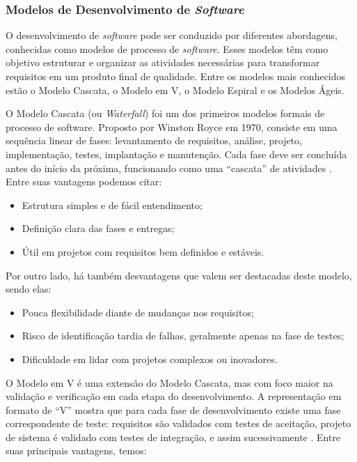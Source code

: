 \documentclass[english,brazilian]{UNISINOSartigo} %
\begin{document}
\subsubsection{Modelos de Desenvolvimento de \textit{Software}}

O desenvolvimento de \textit{software} pode ser conduzido por diferentes abordagens, conhecidas como modelos de processo de \textit{software}. Esses modelos têm como objetivo estruturar e organizar as atividades necessárias para transformar requisitos em um produto final de qualidade. Entre os modelos mais conhecidos estão o Modelo Cascata, o Modelo em V, o Modelo Espiral e os Modelos Ágeis.

O Modelo Cascata (ou \textit{Waterfall}) foi um dos primeiros modelos formais de processo de software. Proposto por Winston Royce em 1970, consiste em uma sequência linear de fases: levantamento de requisitos, análise, projeto, implementação, testes, implantação e manutenção. Cada fase deve ser concluída antes do início da próxima, funcionando como uma “cascata” de atividades \cite{sommerville2011}. Entre suas vantagens podemos citar:

\begin{itemize}[leftmargin=1cm, itemsep=0.1em, topsep=0.1em]
    \item Estrutura simples e de fácil entendimento;
    \item Definição clara das fases e entregas;
    \item Útil em projetos com requisitos bem definidos e estáveis.
\end{itemize}

Por outro lado, há também desvantagens que valem ser destacadas deste modelo, sendo elas:

\begin{itemize}[leftmargin=1cm, itemsep=0.1em, topsep=0.1em]
    \item Pouca flexibilidade diante de mudanças nos requisitos;
    \item Risco de identificação tardia de falhas, geralmente apenas na fase de testes;
    \item Dificuldade em lidar com projetos complexos ou inovadores.
\end{itemize}

O Modelo em V é uma extensão do Modelo Cascata, mas com foco maior na validação e verificação em cada etapa do desenvolvimento. A representação em formato de “V” mostra que para cada fase de desenvolvimento existe uma fase correspondente de teste: requisitos são validados com testes de aceitação, projeto de sistema é validado com testes de integração, e assim sucessivamente \cite{pressman2016}. Entre suas principais vantagens, temos:
\end{document}
